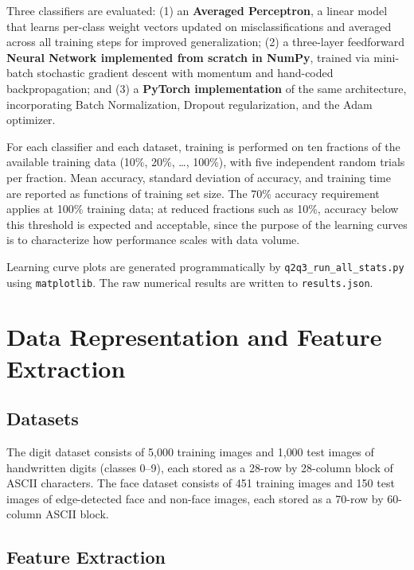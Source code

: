 \documentclass[12pt]{article}
\begin{document}
Three classifiers are evaluated: (1) an \textbf{Averaged Perceptron}, a linear model that
learns per-class weight vectors updated on misclassifications and averaged across all
training steps for improved generalization; (2) a three-layer feedforward \textbf{Neural
Network implemented from scratch in NumPy}, trained via mini-batch stochastic gradient
descent with momentum and hand-coded backpropagation; and (3) a \textbf{PyTorch
implementation} of the same architecture, incorporating Batch Normalization, Dropout
regularization, and the Adam optimizer.

For each classifier and each dataset, training is performed on ten fractions of the
available training data (10\%, 20\%, \ldots, 100\%), with five independent random trials
per fraction. Mean accuracy, standard deviation of accuracy, and training time are
reported as functions of training set size. The 70\% accuracy requirement applies at
100\% training data; at reduced fractions such as 10\%, accuracy below this threshold is
expected and acceptable, since the purpose of the learning curves is to characterize how
performance scales with data volume.

Learning curve plots are generated programmatically by \texttt{q2q3\_run\_all\_stats.py}
using \texttt{matplotlib}. The raw numerical results are written to \texttt{results.json}.

\section{Data Representation and Feature Extraction}
\label{sec:data}

\subsection{Datasets}

The digit dataset consists of 5{,}000 training images and 1{,}000 test images of
handwritten digits (classes 0--9), each stored as a 28-row by 28-column block of ASCII
characters. The face dataset consists of 451 training images and 150 test images of
edge-detected face and non-face images, each stored as a 70-row by 60-column ASCII block.

\subsection{Feature Extraction}
\end{document}
